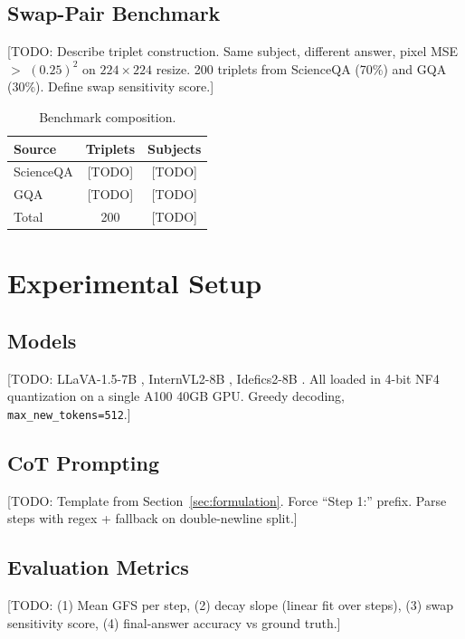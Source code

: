 \documentclass{colm2026}
\begin{document}
\subsection{Swap-Pair Benchmark}
\label{sec:benchmark}

[TODO: Describe triplet construction. Same subject, different answer, pixel
MSE $>$ $(0.25)^2$ on $224 \times 224$ resize. 200 triplets from ScienceQA
(70\%) and GQA (30\%). Define swap sensitivity score.]

\begin{table}[t]
\centering
\caption{Benchmark composition.}
\label{tab:benchmark}
\begin{tabular}{lcc}
\toprule
Source & Triplets & Subjects \\
\midrule
ScienceQA & [TODO] & [TODO] \\
GQA & [TODO] & [TODO] \\
\midrule
Total & 200 & [TODO] \\
\bottomrule
\end{tabular}
\end{table}

\section{Experimental Setup}
\label{sec:setup}

\subsection{Models}
[TODO: LLaVA-1.5-7B \citep{liu2024llava}, InternVL2-8B \citep{chen2024internvl2},
Idefics2-8B \citep{laurenccon2024idefics2}. All loaded in 4-bit NF4 quantization
on a single A100 40GB GPU. Greedy decoding, \texttt{max\_new\_tokens=512}.]

\subsection{CoT Prompting}
[TODO: Template from Section~\ref{sec:formulation}. Force ``Step 1:'' prefix.
Parse steps with regex + fallback on double-newline split.]

\subsection{Evaluation Metrics}
[TODO: (1) Mean GFS per step, (2) decay slope (linear fit over steps), (3) swap
sensitivity score, (4) final-answer accuracy vs ground truth.]
\end{document}
